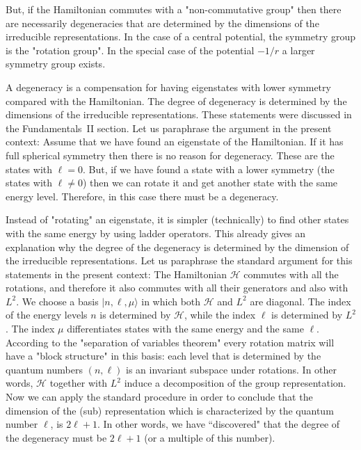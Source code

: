 \documentclass[onecolumn,fleqn]{revtex4}
\begin{document}
But, if the Hamiltonian commutes with 
a "non-commutative group" then there 
are necessarily degeneracies that are 
determined by the dimensions of the irreducible 
representations. In the case of a central potential, 
the symmetry group is the "rotation group". 
In the special case of the potential ${-1/r}$ 
a larger symmetry group exists. 


A degeneracy is a compensation for having  
eigenstates with lower symmetry compared with the Hamiltonian. 
The degree of degeneracy is determined 
by the dimensions of the irreducible representations. 
These statements were discussed 
in the Fundamentals~II section.
Let us paraphrase the argument in the present context: 
Assume that we have found an eigenstate of the Hamiltonian. 
If it has full spherical symmetry then there is no reason for degeneracy. 
These are the states with ${\ell=0}$. 
But, if we have found a state with a lower symmetry 
(the states with ${ \ell \ne 0 }$) then we can rotate 
it and get another state with the same energy level. 
Therefore, in this case there must be a degeneracy. 


Instead of "rotating" an eigenstate, it is simpler (technically) 
to find other states with the same energy by using ladder 
operators. This already gives an explanation why the degree 
of the degeneracy is determined by the dimension of the irreducible 
representations. Let us paraphrase the standard argument 
for this statements in the present context: 
The Hamiltonian ${\mathcal{H}}$ commutes with all the rotations, 
and therefore it also commutes with all their generators and 
also with ${L^2}$. We choose a basis ${|n ,\ell, \mu \rangle}$ 
in which both ${\mathcal{H}}$ and ${L^2}$ are diagonal. 
The index of the energy levels $n$ is determined by ${\mathcal{H}}$, 
while the index $\ell$ is determined by ${L^2}$. 
The index ${\mu}$ differentiates states with the same 
energy and the same ${\ell}$. 
According to the "separation of variables theorem" every rotation 
matrix will have a "block structure" in this basis: each level 
that is determined by the quantum numbers ${(n,\ell)}$ 
is an invariant subspace under rotations. 
In other words, ${\mathcal{H}}$ together with ${L^2}$ induce 
a decomposition of the group representation. 
Now we can apply the standard procedure in order to conclude 
that the dimension of the (sub) representation 
which is characterized by the quantum number ${\ell}$, is ${2\ell+1}$. 
In other words, we have ``discovered" that the degree of the 
degeneracy must be ${2\ell+1}$ (or a multiple of this number). 
\end{document}
